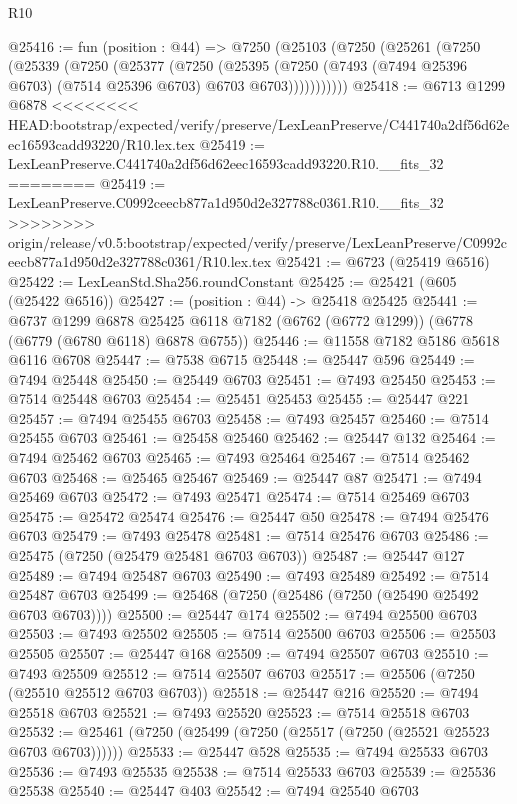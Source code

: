 \begin{lexlean}{R10}
\begin{coremodule}
{{{{{{{{{{{{{{{{{{{{{{{{{{{{{{{{{{{{{{{{{{{{{{{{{{{{{{{{{{{{{{{{{{{{{{{{{{{{{{{{{{{{@25416 := fun (position : @44) =>
  @7250
    (@25103
      (@7250
        (@25261
          (@7250
            (@25339
              (@7250
                (@25377
                  (@7250
                    (@25395
                      (@7250 (@7493 (@7494 @25396 @6703) (@7514 @25396 @6703) @6703 @6703)))))))))))
@25418 := @6713 @1299 @6878
<<<<<<<< HEAD:bootstrap/expected/verify/preserve/LexLeanPreserve/C441740a2df56d62eec16593cadd93220/R10.lex.tex
@25419 := LexLeanPreserve.C441740a2df56d62eec16593cadd93220.R10.__fits_32
========
@25419 := LexLeanPreserve.C0992ceecb877a1d950d2e327788c0361.R10.__fits_32
>>>>>>>> origin/release/v0.5:bootstrap/expected/verify/preserve/LexLeanPreserve/C0992ceecb877a1d950d2e327788c0361/R10.lex.tex
@25421 := @6723 (@25419 @6516)
@25422 := LexLeanStd.Sha256.roundConstant
@25425 := @25421 (@605 (@25422 @6516))
@25427 := (position : @44) -> @25418 @25425
@25441 := @6737
    @1299
    @6878
    @25425
    @6118
    @7182
    (@6762 (@6772 @1299))
    (@6778 (@6779 (@6780 @6118) @6878 @6755))
@25446 := @11558 @7182 @5186 @5618 @6116 @6708
@25447 := @7538 @6715
@25448 := @25447 @596
@25449 := @7494 @25448
@25450 := @25449 @6703
@25451 := @7493 @25450
@25453 := @7514 @25448 @6703
@25454 := @25451 @25453
@25455 := @25447 @221
@25457 := @7494 @25455 @6703
@25458 := @7493 @25457
@25460 := @7514 @25455 @6703
@25461 := @25458 @25460
@25462 := @25447 @132
@25464 := @7494 @25462 @6703
@25465 := @7493 @25464
@25467 := @7514 @25462 @6703
@25468 := @25465 @25467
@25469 := @25447 @87
@25471 := @7494 @25469 @6703
@25472 := @7493 @25471
@25474 := @7514 @25469 @6703
@25475 := @25472 @25474
@25476 := @25447 @50
@25478 := @7494 @25476 @6703
@25479 := @7493 @25478
@25481 := @7514 @25476 @6703
@25486 := @25475 (@7250 (@25479 @25481 @6703 @6703))
@25487 := @25447 @127
@25489 := @7494 @25487 @6703
@25490 := @7493 @25489
@25492 := @7514 @25487 @6703
@25499 := @25468 (@7250 (@25486 (@7250 (@25490 @25492 @6703 @6703))))
@25500 := @25447 @174
@25502 := @7494 @25500 @6703
@25503 := @7493 @25502
@25505 := @7514 @25500 @6703
@25506 := @25503 @25505
@25507 := @25447 @168
@25509 := @7494 @25507 @6703
@25510 := @7493 @25509
@25512 := @7514 @25507 @6703
@25517 := @25506 (@7250 (@25510 @25512 @6703 @6703))
@25518 := @25447 @216
@25520 := @7494 @25518 @6703
@25521 := @7493 @25520
@25523 := @7514 @25518 @6703
@25532 := @25461 (@7250 (@25499 (@7250 (@25517 (@7250 (@25521 @25523 @6703 @6703))))))
@25533 := @25447 @528
@25535 := @7494 @25533 @6703
@25536 := @7493 @25535
@25538 := @7514 @25533 @6703
@25539 := @25536 @25538
@25540 := @25447 @403
@25542 := @7494 @25540 @6703
}}}}}}}}}}}}}}}}}}}}}}}}}}}}}}}}}}}}}}}}}}}}}}}}}}}}}}}}}}}}}}}}}}}}}}}}}}}}}}}}}}}}
\end{coremodule}
\end{lexlean}
